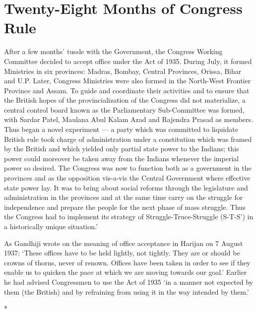 \chapter{Twenty-Eight Months of Congress Rule}
\begin{multicols}{2}

After a few months' tussle with the Government, the Congress Working Committee decided to accept office under the Act of 1935. During July, it formed Ministries in six provinces: Madras, Bombay, Central Provinces, Orissa, Bihar and U.P. Later, Congress Ministries were also formed in the North-West Frontier Province and Assam. To guide and coordinate their activities and to ensure that the British hopes of the provincialization of the Congress did not materialize, a central control board known as the Parliamentary Sub-Committee was formed, with Sardar Patel, Maulana Abul Kalam Azad and Rajendra Prasad as members. Thus began a novel experiment --- a party which was committed to liquidate British rule took charge of administration under a constitution which was framed by the British and which yielded only partial state power to the Indians; this power could moreover be taken away from the Indians whenever the imperial power so desired. The Congress was now to function both as a government in the provinces and as the opposition vis-a-vis the Central Government where effective state power lay. It was to bring about social reforms through the legislature and administration in the provinces and at the same time carry on the struggle for independence and prepare the people for the next phase of mass struggle. Thus the Congress had to implement its strategy of Struggle-Truce-Struggle (S-T-S') in a historically unique situation.' 

As Gandhiji wrote on the meaning of office acceptance in Harijan on 7 August 1937: `These offices have to be held lightly, not tightly. They are or should be crowns of thorns, never of renown. Offices have been taken in order to see if they enable us to quicken the pace at which we are moving towards our goal.' Earlier he had advised Congressmen to use the Act of 1935 `in a manner not expected by them (the British) and by refraining from using it in the way intended by them.'

\begin{center}*\end{center}

\paragraph*{}


\end{multicols}
